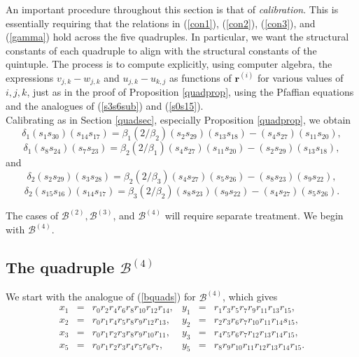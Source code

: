 \documentclass[letterpaper,10pt]{amsart}
\newcommand{\Br}{{\mathbf{r}}}
\newcommand{\B}{{\mathcal{B}}}
\theoremstyle{definition}
\numberwithin{equation}{section}
\begin{document}
An important procedure throughout this section is that of \emph{calibration}. This is essentially requiring that the relations in (\ref{con1}), (\ref{con2}), (\ref{con3}), and (\ref{gamma}) hold across the five quadruples. In particular, we want the structural constants of each quadruple to align with the structural constants of the quintuple. The process is to compute explicitly, using computer algebra, the expressions $v_{j,k} - w_{j,k}$ and $u_{j,k} - u_{k,j}$ as functions of $\Br^{(i)}$ for various values of $i,j,k$, just as in the proof of Proposition \ref{quadprop}, using the Pfaffian equations and the analogues of (\ref{s3s6sub}) and (\ref{s0s15}). \\

Calibrating as in Section \ref{quadsec}, especially Proposition \ref{quadprop}, we obtain 
\begin{equation} \label{b5caleq} \delta_1 (s_1 s_{30})(s_{14} s_{17}) = \beta_1 (2/\beta_2) (s_2 s_{29})(s_{13} s_{18}) - (s_4 s_{27})(s_{11} s_{20}) ,\end{equation}
\[\delta_1  (s_8 s_{24})(s_7 s_{23}) = \beta_2 (2/\beta_1) (s_4 s_{27})(s_{11} s_{20}) - (s_2 s_{29})(s_{13} s_{18}),\]
and
\begin{equation} \label{b1caleq} \delta_2 (s_2 s_{29})(s_3 s_{28}) = \beta_2 (2/\beta_3) (s_4 s_{27})(s_5 s_{26}) - (s_8 s_{23})(s_9 s_{22}), \end{equation}
\[\delta_2 (s_{15} s_{16})(s_{14} s_{17}) = \beta_3 (2/\beta_2) (s_8 s_{23})(s_9 s_{22}) - (s_4 s_{27})(s_5 s_{26}).\]


The cases of $\B^{(2)}, \B^{(3)}$, and $\B^{(4)}$ will require separate treatment. We begin with $\B^{(4)}$. 

\subsection{The quadruple $\B^{(4)}$}
\label{B4par}  

We start with the analogue of (\ref{bquads}) for $\B^{(4)}$, which gives 
\begin{equation} \label{b4quads} \begin{matrix} x_1 & = & r_0 r_2 r_4 r_6 r_8 r_{10} r_{12} r_{14}, & y_1 & = & r_1 r_3 r_5 r_7 r_9 r_{11} r_{13} r_{15}, \\
x_2 & = & r_0 r_1 r_4 r_5 r_8 r_9 r_{12} r_{13}, & y_2 & = & r_2 r_3 r_6 r_7 r_{10} r_{11} r_{14} s_{15}, \\
x_3 & = & r_0 r_1 r_2 r_3 r_8 r_9 r_{10} r_{11}, & y_3 & = & r_4 r_5 r_6 r_7 r_{12} r_{13} r_{14} r_{15}, \\
x_5 & = & r_0 r_1 r_2 r_3 r_4 r_5 r_6 r_7, & y_5 & = & r_8 r_9 r_{10} r_{11} r_{12} r_{13} r_{14} r_{15}. 
\end{matrix}
\end{equation} 
\end{document}
